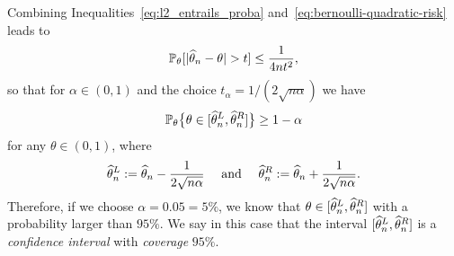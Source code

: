 
Combining Inequalities~\eqref{eq:l2_entrails_proba} and~\eqref{eq:bernoulli-quadratic-risk} leads to
\begin{equation*}
	\mathbb P_\theta[ |\widehat \theta_n - \theta| > t] \leq \frac{1}{4 n t^2},
\end{equation*}
so that for $\alpha \in (0, 1)$ and the choice $t_\alpha = 1 / (2 \sqrt{n \alpha})$ we have 
\begin{equation}
	\label{eq:bernoulli-first-ci}
	\mathbb P_\theta \big\{ \theta \in [ \widehat \theta_n^L, \widehat \theta_n^R ] \big\} \geq 1 - \alpha
\end{equation}
for any $\theta \in (0,1 )$, where
\begin{equation*}
	\widehat \theta_n^L := \widehat \theta_n - \frac{1}{2 \sqrt{n \alpha}} \quad \text{ and } 
	\quad \widehat \theta_n^R := \widehat \theta_n + \frac{1}{2 \sqrt{n \alpha}}.
\end{equation*}
Therefore, if we choose $\alpha = 0.05 = 5\%$, we know that $\theta \in [\widehat \theta_n^L, \widehat \theta_n^R]$ with a probability larger than $95\%$.
We say in this case that the interval $[\widehat \theta_n^L, \widehat \theta_n^R]$ is a \emph{confidence interval} with \emph{coverage} $95\%$.%

